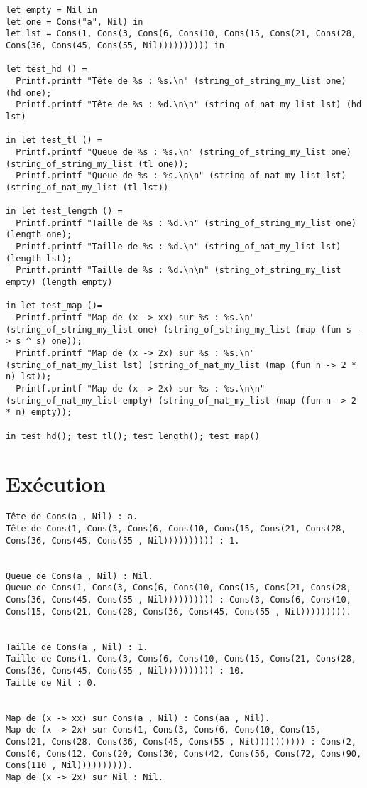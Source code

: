 \documentclass{article}
\begin{document}
\begin{verbatim}
let empty = Nil in
let one = Cons("a", Nil) in 
let lst = Cons(1, Cons(3, Cons(6, Cons(10, Cons(15, Cons(21, Cons(28, Cons(36, Cons(45, Cons(55, Nil)))))))))) in

let test_hd () = 
  Printf.printf "Tête de %s : %s.\n" (string_of_string_my_list one) (hd one);
  Printf.printf "Tête de %s : %d.\n\n" (string_of_nat_my_list lst) (hd lst)

in let test_tl () = 
  Printf.printf "Queue de %s : %s.\n" (string_of_string_my_list one) (string_of_string_my_list (tl one));
  Printf.printf "Queue de %s : %s.\n\n" (string_of_nat_my_list lst) (string_of_nat_my_list (tl lst))

in let test_length () = 
  Printf.printf "Taille de %s : %d.\n" (string_of_string_my_list one) (length one);
  Printf.printf "Taille de %s : %d.\n" (string_of_nat_my_list lst) (length lst);
  Printf.printf "Taille de %s : %d.\n\n" (string_of_string_my_list empty) (length empty)

in let test_map ()= 
  Printf.printf "Map de (x -> xx) sur %s : %s.\n" (string_of_string_my_list one) (string_of_string_my_list (map (fun s -> s ^ s) one));
  Printf.printf "Map de (x -> 2x) sur %s : %s.\n" (string_of_nat_my_list lst) (string_of_nat_my_list (map (fun n -> 2 * n) lst));
  Printf.printf "Map de (x -> 2x) sur %s : %s.\n\n" (string_of_nat_my_list empty) (string_of_nat_my_list (map (fun n -> 2 * n) empty));

in test_hd(); test_tl(); test_length(); test_map()
\end{verbatim}

\section{Exécution}

\begin{verbatim}
Tête de Cons(a , Nil) : a.
Tête de Cons(1, Cons(3, Cons(6, Cons(10, Cons(15, Cons(21, Cons(28, Cons(36, Cons(45, Cons(55 , Nil)))))))))) : 1.


Queue de Cons(a , Nil) : Nil.
Queue de Cons(1, Cons(3, Cons(6, Cons(10, Cons(15, Cons(21, Cons(28, Cons(36, Cons(45, Cons(55 , Nil)))))))))) : Cons(3, Cons(6, Cons(10, Cons(15, Cons(21, Cons(28, Cons(36, Cons(45, Cons(55 , Nil))))))))).


Taille de Cons(a , Nil) : 1.
Taille de Cons(1, Cons(3, Cons(6, Cons(10, Cons(15, Cons(21, Cons(28, Cons(36, Cons(45, Cons(55 , Nil)))))))))) : 10.
Taille de Nil : 0.


Map de (x -> xx) sur Cons(a , Nil) : Cons(aa , Nil).
Map de (x -> 2x) sur Cons(1, Cons(3, Cons(6, Cons(10, Cons(15, Cons(21, Cons(28, Cons(36, Cons(45, Cons(55 , Nil)))))))))) : Cons(2, Cons(6, Cons(12, Cons(20, Cons(30, Cons(42, Cons(56, Cons(72, Cons(90, Cons(110 , Nil)))))))))).
Map de (x -> 2x) sur Nil : Nil.

\end{verbatim}
\end{document}
